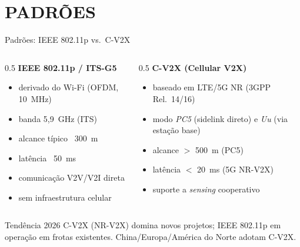 \documentclass[aspectratio=169,11pt]{beamer}
\begin{document}
\section{PADRÕES}

\begin{frame}{Padrões: IEEE 802.11p vs.\ C-V2X}
  \begin{columns}
    \begin{column}{0.5\textwidth}
      \textbf{IEEE 802.11p / ITS-G5}
      \begin{itemize}
        \item derivado do Wi-Fi (OFDM, 10~MHz)
        \item banda 5,9~GHz (ITS)
        \item alcance típico ~300~m
        \item latência ~50~ms
        \item comunicação V2V/V2I direta
        \item sem infraestrutura celular
      \end{itemize}
    \end{column}
    \begin{column}{0.5\textwidth}
      \textbf{C-V2X (Cellular V2X)}
      \begin{itemize}
        \item baseado em LTE/5G NR (3GPP Rel.\ 14/16)
        \item modo \emph{PC5} (sidelink direto) e \emph{Uu} (via estação base)
        \item alcance $>$ 500~m (PC5)
        \item latência $<$ 20~ms (5G NR-V2X)
        \item suporte a \emph{sensing} cooperativo
      \end{itemize}
    \end{column}
  \end{columns}
  \vspace{0.2cm}
  \begin{exampleblock}{Tendência 2026}
    C-V2X (NR-V2X) domina novos projetos; IEEE 802.11p em operação em frotas existentes. China/Europa/América do Norte adotam C-V2X.
  \end{exampleblock}
\end{frame}
\end{document}
